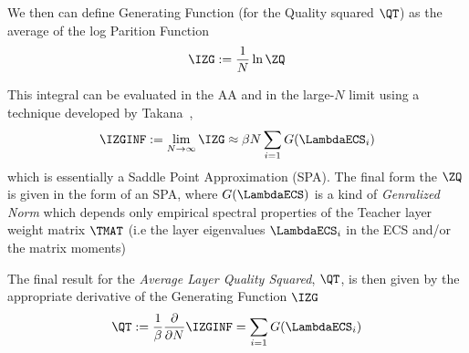 We then can define Generating Function (for the Quality squared $\QT$)
as the average of the log Parition Function
\begin{align}
  \label{eqn:IZG}
  \IZG:=  \dfrac{1}{N} \ln \ZQ
\end{align}

This integral can be evaluated in the AA and in the large-$N$ limit
using a technique developed by Takana~\cite{Tanaka},
\begin{align}
  \label{eqn:IZGINF}
  \IZGINF:= \lim_{N\rightarrow\infty} \IZG \approx \beta N \sum_{i=1}G(\LambdaECS_{i})
\end{align}
which is essentially a Saddle Point Approximation (SPA).
The final form the $\ZQ$ is given in the form of an SPA, where $G(\LambdaECS)$ is a kind of \emph{Genralized Norm}
which depends only empirical spectral properties of the Teacher layer weight matrix $\TMAT$
(i.e the layer eigenvalues $\LambdaECS_{i}$ in the ECS and/or the matrix moments)

The final result for the \emph{Average Layer Quality Squared}, $\QT$, is then given by the appropriate
derivative of the Generating Function $\IZG$
\begin{align}
  \label{eqn:Q2}
  \QT:= \frac{1}{\beta}\frac{\partial}{\partial N}\IZGINF = \sum_{i=1}G(\LambdaECS_{i})
\end{align}









